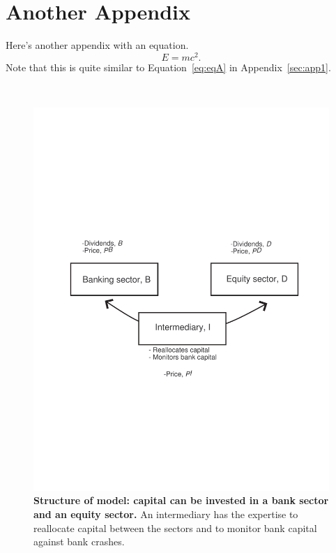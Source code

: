 \documentclass[11pt]{article}
\begin{document}
\section{Another Appendix}
\label{sec:app2}

Here's another appendix with an equation.
\begin{equation}
  E = mc^2.
\end{equation}
Note that this is quite similar to Equation~\eqref{eq:eqA} in Appendix~\ref{sec:app1}.

\clearpage


\begin{doublespacing}   %


\end{doublespacing}

\clearpage

\renewcommand{\enotesize}{\normalsize}
\begin{doublespacing}
  \theendnotes
\end{doublespacing}

\clearpage

\ 
\vfill
\begin{figure}[!htb]
\centerline{\includegraphics[width=7in]{Figure1}}
  \caption{{\bf Structure of model: capital can be invested in a bank sector and an equity sector.} An intermediary has the expertise to reallocate capital between the sectors and to monitor bank capital against bank crashes.} \label{fig:0}
\end{figure}
\vfill
\ 
\end{document}
